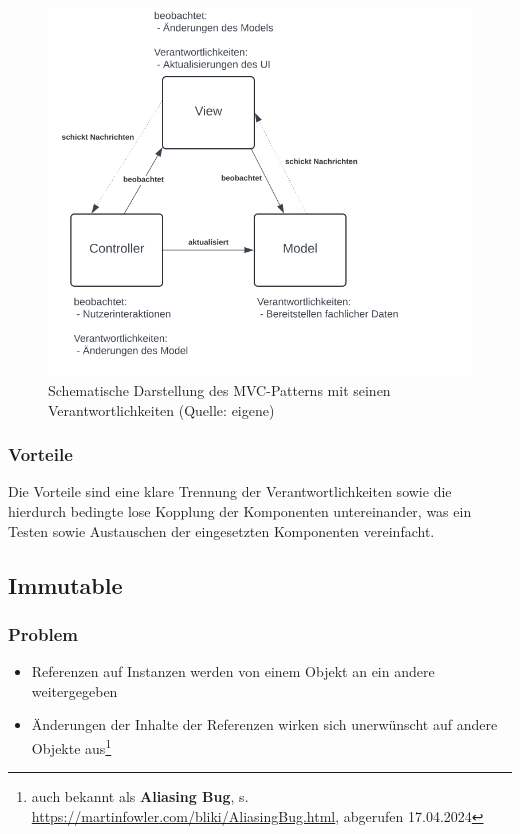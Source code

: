 \begin{figure}
    \centering
    \includegraphics[scale=0.4]{part two/Objektorientierter Entwurf/img/mvc}
    \caption{Schematische Darstellung des MVC-Patterns mit seinen Verantwortlichkeiten (Quelle: eigene)}
    \label{fig:mvc}
\end{figure}

\subsubsection*{Vorteile}
Die Vorteile sind eine klare Trennung der Verantwortlichkeiten sowie die hierdurch bedingte lose Kopplung der Komponenten untereinander, was ein Testen sowie Austauschen der eingesetzten Komponenten vereinfacht.

\subsection{Immutable}\label{subsec:immutable}

\subsubsection*{Problem}
\begin{itemize}
    \item Referenzen auf Instanzen werden von einem Objekt an ein andere weitergegeben
    \item Änderungen der Inhalte der Referenzen wirken sich unerwünscht auf andere Objekte aus\footnote{
    auch bekannt als \textbf{Aliasing Bug}, s. \url{https://martinfowler.com/bliki/AliasingBug.html}, abgerufen 17.04.2024
    }
\end{itemize}

